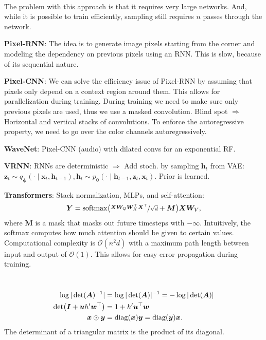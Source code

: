 \documentclass{article}
\newcommand{\lft}{\mathopen{}\mathclose\bgroup\left}
\newcommand{\rgt}{\aftergroup\egroup\right}
\renewcommand{\vec}[1]{\bm{#1}}
\newcommand{\mat}[1]{\bm{#1}}
\newenvironment{topic}[1]
{\textbf{\sffamily \colorbox{black}{\rlap{\textbf{\textcolor{white}{#1}}}\hspace{\linewidth}\hspace{-2\fboxsep}}} \\ \vspace{0.2cm}}
{}
\begin{document}
\begin{multicols*}{2}
\begin{topic}{Autoregressive models}
        The problem with this approach is that it requires very large networks. And, while it is possible
        to train efficiently, sampling still requires $n$ passes through the network.

        \textbf{Pixel-RNN}: The idea is to generate image pixels starting from the corner and
        modeling the dependency on previous pixels using an RNN. This is slow, because of its
        sequential nature.

        \textbf{Pixel-CNN}: We can solve the efficiency issue of Pixel-RNN by assuming that pixels
        only depend on a context region around them. This allows for parallelization during training.
        During training we need to make sure only previous pixels are used, thus we use a masked
        convolution. Blind spot $\Rightarrow$ Horizontal and vertical stacks of
        convolutions. To enforce the autoregressive property, we need to go over the color channels
        autoregressively.

        \textbf{WaveNet}: Pixel-CNN (audio) with dilated convs for an exponential RF.

        \textbf{VRNN}: RNNs are deterministic $\Rightarrow$ Add stoch. by sampling $\vec{h}_t$ from VAE:
        $\vec{z}_t \sim q_{\vec{\phi}}(\cdot \mid \vec{x}_t, \vec{h}_{t-1}), \vec{h}_t \sim p_{\vec{\theta}}(\cdot \mid \vec{h}_{t-1}, \vec{z}_t, \vec{x}_t)$. Prior is learned.

        \textbf{Transformers}: Stack normalization, MLPs, and self-attention: \[
            \mat{Y} = \mathrm{softmax}\lft( \nicefrac{\mat{X} \mat{W}_Q \mat{W}_K^\top \mat{X}^\top}{\sqrt{d}} + \mat{M} \rgt) \mat{X} \mat{W}_V,
        \]
        where $\mat{M}$ is a mask that masks out future timesteps with $-\infty$. Intuitively, the softmax
        computes how much attention should be given to certain values. Computational complexity is
        $\mathcal{O}(n^2d)$ with a maximum path length between input and output of $\mathcal{O}(1)$. This
        allows for easy error propagation during training.
    \end{topic}

    \begin{topic}{Normalizing flow}
        \begin{align*}
            \log |\det(\mat{A})^{-1}|                          & = \log |\det(\mat{A})|^{-1} = -\log |\det(\mat{A})|                \\
            \det \lft( \mat{I} + \vec{u} h' \vec{w}^\top \rgt) & = 1 + h' \vec{u}^\top \vec{w}                                      \\
            \vec{x} \odot \vec{y}                              & = \mathrm{diag}(\vec{x}) \vec{y} = \mathrm{diag}(\vec{y}) \vec{x}.
        \end{align*}
        The determinant of a triangular matrix is the product of its diagonal.


\end{topic}
\end{multicols*}
\end{document}
